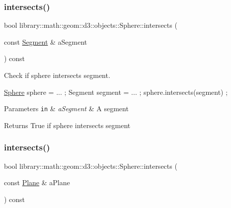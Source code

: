 \subsubsection{\texorpdfstring{intersects()}{intersects()}\hspace{0.1cm}{\footnotesize\ttfamily [5/9]}}
{\footnotesize\ttfamily bool library\+::math\+::geom\+::d3\+::objects\+::\+Sphere\+::intersects (\begin{DoxyParamCaption}\item[{const \hyperlink{classlibrary_1_1math_1_1geom_1_1d3_1_1objects_1_1_segment}{Segment} \&}]{a\+Segment }\end{DoxyParamCaption}) const}



Check if sphere intersects segment. 


\begin{DoxyCode}
\hyperlink{classlibrary_1_1math_1_1geom_1_1d3_1_1objects_1_1_sphere_a55dccc8ea16ee55cd7694c26afa8ea39}{Sphere} sphere = ... ;
Segment segment = ... ;
sphere.intersects(segment) ;
\end{DoxyCode}



\begin{DoxyParams}[1]{Parameters}
\mbox{\tt in}  & {\em a\+Segment} & A segment \\
\hline
\end{DoxyParams}
\begin{DoxyReturn}{Returns}
True if sphere intersects segment 
\end{DoxyReturn}
\mbox{\label{classlibrary_1_1math_1_1geom_1_1d3_1_1objects_1_1_sphere_aa0893ce62c0798552353338aad0b8da4}} 
\subsubsection{\texorpdfstring{intersects()}{intersects()}\hspace{0.1cm}{\footnotesize\ttfamily [6/9]}}
{\footnotesize\ttfamily bool library\+::math\+::geom\+::d3\+::objects\+::\+Sphere\+::intersects (\begin{DoxyParamCaption}\item[{const \hyperlink{classlibrary_1_1math_1_1geom_1_1d3_1_1objects_1_1_plane}{Plane} \&}]{a\+Plane }\end{DoxyParamCaption}) const}



